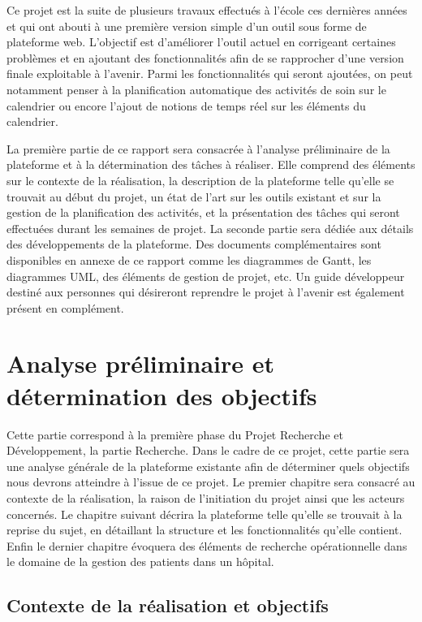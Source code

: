 \documentclass{polytech/polytech}
\begin{document}
Ce projet est la suite de plusieurs travaux effectués à l'école ces dernières années et qui ont abouti à une première version simple d'un outil sous forme de plateforme web. L'objectif est d'améliorer l'outil actuel en corrigeant certaines problèmes et en ajoutant des fonctionnalités afin de se rapprocher d'une version finale exploitable à l'avenir. Parmi les fonctionnalités qui seront ajoutées, on peut notamment penser à la planification automatique des activités de soin sur le calendrier ou encore l'ajout de notions de temps réel sur les éléments du calendrier.

La première partie de ce rapport sera consacrée à l'analyse préliminaire de la plateforme et à la détermination des tâches à réaliser. Elle comprend des éléments sur le contexte de la réalisation, la description de la plateforme telle qu'elle se trouvait au début du projet, un état de l'art sur les outils existant et sur la gestion de la planification des activités, et la présentation des tâches qui seront effectuées durant les semaines de projet. La seconde partie sera dédiée aux détails des développements de la plateforme. Des documents complémentaires sont disponibles en annexe de ce rapport comme les diagrammes de Gantt, les diagrammes UML, des éléments de gestion de projet, etc. Un guide développeur destiné aux personnes qui désireront reprendre le projet à l'avenir est également présent en complément.


\part{Analyse préliminaire et détermination des objectifs}


Cette partie correspond à la première phase du Projet Recherche et Développement, la partie Recherche. Dans le cadre de ce projet, cette partie sera une analyse générale de la plateforme existante afin de déterminer quels objectifs nous devrons atteindre à l'issue de ce projet. Le premier chapitre sera consacré au contexte de la réalisation, la raison de l'initiation du projet ainsi que les acteurs concernés. Le chapitre suivant décrira la plateforme telle qu'elle se trouvait à la reprise du sujet, en détaillant la structure et les fonctionnalités qu'elle contient. Enfin le dernier chapitre évoquera des éléments de recherche opérationnelle dans le domaine de la gestion des patients dans un hôpital. 


\chapter{Contexte de la réalisation et objectifs}
\end{document}
